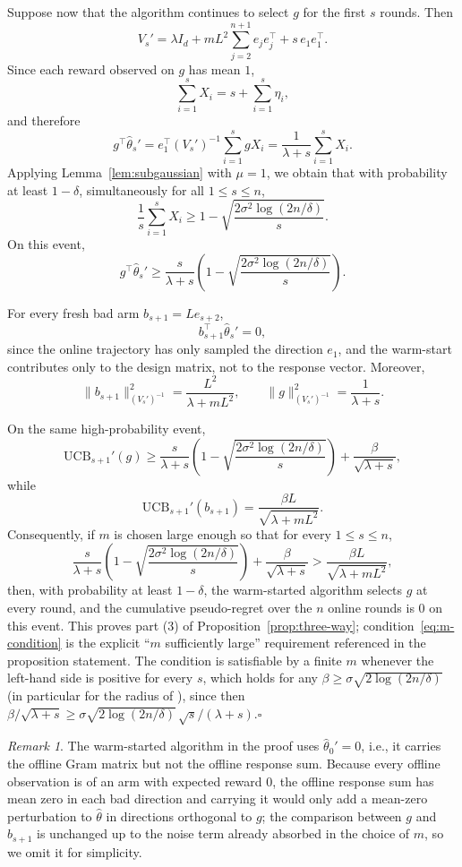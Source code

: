 \documentclass{article}
\theoremstyle{definition}
\theoremstyle{remark}
\newtheorem{remark}{Remark}
\theoremstyle{remark}
\begin{document}
Suppose now that the algorithm continues to select $g$ for the first $s$ rounds. Then
\[
V_s'
=
\lambda I_d
+
mL^2 \sum_{j=2}^{n+1} e_j e_j^\top
+
s\, e_1 e_1^\top.
\]
Since each reward observed on $g$ has mean $1$,
\[
\sum_{i=1}^s X_i = s + \sum_{i=1}^s \eta_i,
\]
and therefore
\[
g^\top \hat{\theta}_s'
=
e_1^\top (V_s')^{-1}\sum_{i=1}^s g X_i
=
\frac{1}{\lambda+s}\sum_{i=1}^s X_i.
\]
Applying Lemma~\ref{lem:subgaussian} with $\mu=1$, we obtain that with probability at least $1-\delta$, simultaneously for all $1\le s\le n$,
\[
\frac{1}{s}\sum_{i=1}^s X_i
\ge
1-\sqrt{\frac{2\sigma^2\log(2n/\delta)}{s}}.
\]
On this event,
\[
g^\top \hat{\theta}_s'
\ge
\frac{s}{\lambda+s}
\left(
1-\sqrt{\frac{2\sigma^2\log(2n/\delta)}{s}}
\right).
\]

For every fresh bad arm $b_{s+1}=Le_{s+2}$,
\[
b_{s+1}^\top \hat{\theta}_s' = 0,
\]
since the online trajectory has only sampled the direction $e_1$, and the warm-start contributes only to the design matrix, not to the response vector. Moreover,
\[
\|b_{s+1}\|_{(V_s')^{-1}}^2
=
\frac{L^2}{\lambda+mL^2},
\qquad
\|g\|_{(V_s')^{-1}}^2
=
\frac{1}{\lambda+s}.
\]

On the same high-probability event,
\[
\mathrm{UCB}_{s+1}'(g)
\ge
\frac{s}{\lambda+s}
\left(
1-\sqrt{\frac{2\sigma^2\log(2n/\delta)}{s}}
\right)
+
\frac{\beta}{\sqrt{\lambda+s}},
\]
while
\[
\mathrm{UCB}_{s+1}'(b_{s+1})
=
\frac{\beta L}{\sqrt{\lambda+mL^2}}.
\]
Consequently, if $m$ is chosen large enough so that for every $1\le s\le n$,
\begin{equation}
\label{eq:m-condition}
\frac{s}{\lambda+s}
\left(
1-\sqrt{\frac{2\sigma^2\log(2n/\delta)}{s}}
\right)
+
\frac{\beta}{\sqrt{\lambda+s}}
>
\frac{\beta L}{\sqrt{\lambda+mL^2}},
\end{equation}
then, with probability at least $1-\delta$, the warm-started algorithm selects $g$ at every round, and the cumulative pseudo-regret over the $n$ online rounds is $0$ on this event. This proves part (3) of Proposition~\ref{prop:three-way}; condition~\eqref{eq:m-condition} is the explicit ``$m$ sufficiently large'' requirement referenced in the proposition statement. The condition is satisfiable by a finite $m$ whenever the left-hand side is positive for every $s$, which holds for any $\beta\ge\sigma\sqrt{2\log(2n/\delta)}$ (in particular for the radius of \cite{abbasi2011improved}), since then $\beta/\sqrt{\lambda+s}\ge\sigma\sqrt{2\log(2n/\delta)}\,\sqrt s/(\lambda+s)$.\hfill$\square$


\begin{remark}
The warm-started algorithm in the proof uses $\widehat\theta_0'=0$, i.e., it
carries the offline Gram matrix but not the offline response sum. Because
every offline observation is of an arm with expected reward $0$, the offline
response sum has mean zero in each bad direction and carrying it would only
add a mean-zero perturbation to $\widehat\theta$ in directions orthogonal to
$g$; the comparison between $g$ and $b_{s+1}$ is unchanged up to the noise
term already absorbed in the choice of $m$, so we omit it for simplicity.
\end{remark}
\end{document}
